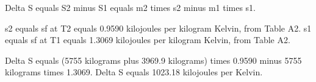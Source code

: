 Delta S equals S2 minus S1 equals m2 times s2 minus m1 times s1.  

s2 equals sf at T2 equals 0.9590 kilojoules per kilogram Kelvin, from Table A2.  
s1 equals sf at T1 equals 1.3069 kilojoules per kilogram Kelvin, from Table A2.  

Delta S equals (5755 kilograms plus 3969.9 kilograms) times 0.9590 minus 5755 kilograms times 1.3069.  
Delta S equals 1023.18 kilojoules per Kelvin.